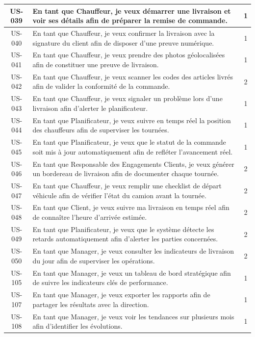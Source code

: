 \begin{longtable}{|c|>{\raggedright\arraybackslash}p{13cm}|c|}
US-039 & En tant que Chauffeur, je veux démarrer une livraison et voir ses détails afin de préparer la remise de commande. & 1 \\\hline
US-040 & En tant que Chauffeur, je veux confirmer la livraison avec la signature du client afin de disposer d'une preuve numérique. & 1 \\\hline
US-041 & En tant que Chauffeur, je veux prendre des photos géolocalisées afin de constituer une preuve de livraison. & 1 \\\hline
US-042 & En tant que Chauffeur, je veux scanner les codes des articles livrés afin de valider la conformité de la commande. & 2 \\\hline
US-043 & En tant que Chauffeur, je veux signaler un problème lors d'une livraison afin d'alerter le planificateur. & 1 \\\hline
US-044 & En tant que Planificateur, je veux suivre en temps réel la position des chauffeurs afin de superviser les tournées. & 1 \\\hline
US-045 & En tant que Planificateur, je veux que le statut de la commande soit mis à jour automatiquement afin de refléter l'avancement réel. & 1 \\\hline
US-046 & En tant que Responsable des Engagements Clients, je veux générer un bordereau de livraison afin de documenter chaque tournée. & 2 \\\hline
US-047 & En tant que Chauffeur, je veux remplir une checklist de départ véhicule afin de vérifier l'état du camion avant la tournée. & 2 \\\hline
US-048 & En tant que Client, je veux suivre ma livraison en temps réel afin de connaître l'heure d'arrivée estimée. & 2 \\\hline
US-049 & En tant que Planificateur, je veux que le système détecte les retards automatiquement afin d'alerter les parties concernées. & 2 \\\hline
US-050 & En tant que Manager, je veux consulter les indicateurs de livraison du jour afin de superviser les opérations. & 2 \\\hline
US-105 & En tant que Manager, je veux un tableau de bord stratégique afin de suivre les indicateurs clés de performance. & 1 \\\hline
US-107 & En tant que Manager, je veux exporter les rapports afin de partager les résultats avec la direction. & 1 \\\hline
US-108 & En tant que Manager, je veux voir les tendances sur plusieurs mois afin d'identifier les évolutions. & 1 \\\hline

\end{longtable}
